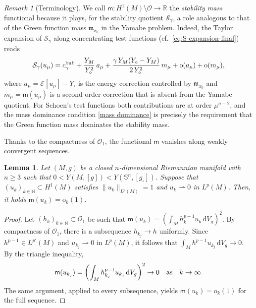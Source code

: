 \documentclass[reqno,11pt]{amsart}
\numberwithin{equation}{section}
\newtheorem{lemma}[theorem]{Lemma}
\theoremstyle{definition}
\theoremstyle{remark}
\newtheorem{remark}[theorem]{Remark}
\newcommand{\ud}{\,\mathrm{d}}
\newcommand{\Ss}{\mathbb{S}}
\begin{document}
\begin{remark}[Terminology]\label{rmk:stability-mass}
We call $\mathsf{m}:H^1(M)\setminus \mathcal{O}\to \mathbb{R}$ the \emph{stability mass} functional because it plays, for the stability
quotient $\mathcal{S}_\gamma$, a role analogous to that of the Green function
mass $\mathfrak{m}_{x_0}$ in the Yamabe problem. Indeed, the Taylor expansion of
$\mathcal{S}_\gamma$ along concentrating test functions (cf.\ \eqref{eq:S-expansion-final}) reads
\[
\mathcal{S}_\gamma(u_\mu) = c_\gamma^{\rm bub}
  + \frac{Y_M}{Y_\circ^2}\, a_\mu
  + \frac{\gamma\, Y_M(Y_\circ - Y_M)}{2\, Y_\circ^2}\, m_\mu
  + \mathrm{o}(a_\mu) + \mathrm{o}(m_\mu),
\]
where $a_\mu = \mathcal{E}[u_\mu] - Y_\circ$ is the energy correction controlled by
$\mathfrak{m}_{x_0}$ and $m_\mu = \mathsf{m}(u_\mu)$ is a second-order correction
that is absent from the Yamabe quotient. For Schoen's test functions both
contributions are at order $\mu^{n-2}$, and the mass dominance
condition \eqref{mass dominance} is precisely the requirement that the Green
function mass dominates the stability mass.
\end{remark}

Thanks to the compactness of $\mathscr{O}_1$, the functional $\mathsf{m}$ vanishes along weakly convergent sequences.

\begin{lemma}
\label{lemma m to 0 weak conv}
Let $(M,g)$ be a closed $n$-dimensional Riemannian manifold with $n \geqslant 3$ 
such that $0 < Y(M,[g]) < Y(\Ss^n,[g_\circ])$.
Suppose that $(u_k)_{k \in \mathbb{N}} \subset H^1(M)$ satisfies $\|u_k\|_{L^p(M)} = 1$ and $u_k \rightharpoonup 0$ in $L^p(M)$. Then, it holds $\mathsf{m}(u_k) = \mathrm{o}_k(1)$.
\end{lemma}

\begin{proof}
Let $(h_k)_{k \in \mathbb{N}} \subset \mathscr{O}_1$ be such that 
$\mathsf{m}(u_k) = (\int_{M} h_k^{p-1} u_k \ud V_g)^2$. By compactness of $\mathscr{O}_1$, 
there is a subsequence $h_{k_j} \to h$ uniformly. Since $h^{p-1} \in L^{p'}(M)$ and 
$u_{k_j} \rightharpoonup 0$ in $L^p(M)$, it follows that $\int_M h^{p-1} u_{k_j} 
\ud V_g \to 0$. By the triangle inequality,
\[
\mathsf{m}(u_{k_j}) = \left(\int_{M} h_{k_j}^{p-1} u_{k_j} \ud V_g\right)^2 \to 0 
\quad {\rm as} \quad k \to \infty.
\]
The same argument, applied to every subsequence, yields $\mathsf{m}(u_k) = \mathrm{o}_k(1)$ for 
the full sequence.
\end{proof}
\end{document}
